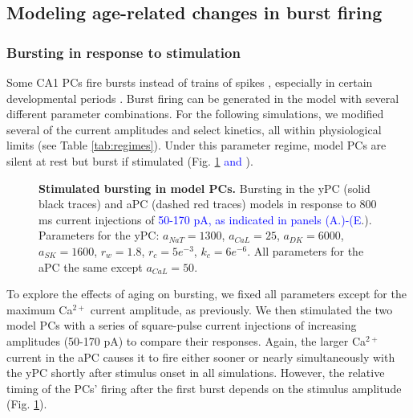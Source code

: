 \documentclass[10pt,letterpaper]{article}
\newcommand{\Ca}{Ca$^{2+}$}
\newcommand{\edit}[1]{\textcolor{blue}{#1}}
\begin{document}
\subsection*{Modeling age-related changes in burst firing}

\smallskip

\subsubsection*{Bursting in response to stimulation}

Some CA1 PCs fire bursts instead of trains of spikes \cite{su2001extracellular}, especially in certain developmental periods \cite{chen2005transitional}. Burst firing can be generated in the model with several different parameter combinations. For the following simulations, we modified several of the current amplitudes and select kinetics, all within physiological limits (see Table \ref{tab:regimes}). Under this parameter regime, model PCs are silent at rest but burst if stimulated (Fig. \ref{fig:burstStims} \edit{and }).

\begin{figure}[h!]
\centering
\caption{{\bf Stimulated bursting in model PCs.}
Bursting in the yPC (solid black traces) and aPC (dashed red traces) models in response to 800 ms current injections of \edit{50-170 pA, as indicated in panels (A.)-(E}.). Parameters for the yPC: $a_{NaT}= 1300$, $a_{CaL}=25$, $a_{DK}=6000$, $a_{SK}=1600$, $r_{w}=1.8$, $r_{c}=5e^{-3}$, $k_{c}=6e^{-6}$. All parameters for the aPC the same except $a_{CaL}=50$.}
\label{fig:burstStims}
\end{figure}

To explore the effects of aging on bursting, we fixed all parameters except for the maximum {\Ca} current amplitude, as previously. We then stimulated the two model PCs with a series of square-pulse current injections of increasing amplitudes (50-170 pA) to compare their responses. Again, the larger {\Ca} current in the aPC causes it to fire either sooner or nearly simultaneously with the yPC shortly after stimulus onset in all simulations. However, the relative timing of the PCs' firing after the first burst depends on the stimulus amplitude (Fig. \ref{fig:burstStims}).
\end{document}
